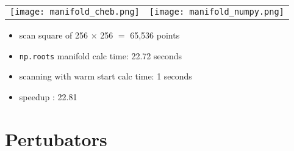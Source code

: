 \documentclass{article}\usepackage[]{graphicx}\usepackage[dvipsnames,table]{xcolor}
\begin{document}
\begin{center}
\begin{tabular}{cc}
\texttt{[image: manifold\_cheb.png]}    
&
\texttt{[image: manifold\_numpy.png]}  
\end{tabular}    
\end{center}

\begin{center}
\begin{itemize}
    \item scan square of 256 $\times$ 256 $=$ 65,536 points
    \item {\tt np.roots} manifold calc time: 22.72 seconds
    \item scanning with warm start calc time: 1 seconds
    \item speedup : 22.81
\end{itemize}
\end{center}

\newpage
\section{Pertubators}
\end{document}
